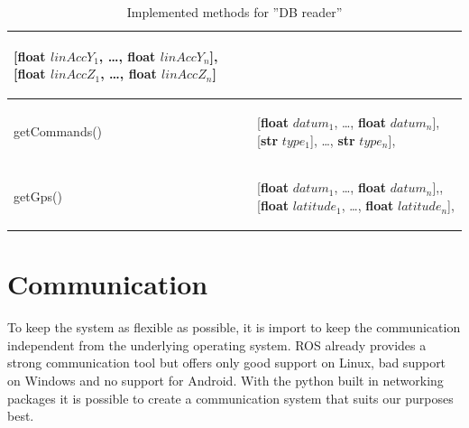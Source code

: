 \documentclass[]{scrreprt}
\begin{document}
\begin{table}[H]
\begin{tabular}{|l|l|}
\begin{pbox}{6.7cm}
{					[\textbf{float} $linAccY_1$, \dots, \textbf{float} $linAccY_n$],
					[\textbf{float} $linAccZ_1$, \dots, \textbf{float} $linAccZ_n$]
					\vspace{.3\baselineskip}}\end{pbox}\\ 
			\hline 
			\begin{pbox}{6.0cm}{\vspace{.2\baselineskip}
					getCommands()
					\vspace{.3\baselineskip}} 
			\end{pbox}&
			\begin{pbox}{10.5cm}{\vspace{.2\baselineskip}
					[\textbf{float} $datum_1$, \dots, \textbf{float} $datum_n$],
					[\textbf{str} $type_1$], \dots, \textbf{str} $type_n$],\newline
					[\textbf{None} or \textbf{float list} $value_1$, \dots, \textbf{None} or \textbf{float list} $value_n$]
					\vspace{.3\baselineskip}}
			\end{pbox}\\ 
			\hline 
			\begin{pbox}{6.0cm}{\vspace{.2\baselineskip}
					getGps()
					\vspace{.3\baselineskip}} 
			\end{pbox}&
			\begin{pbox}{6.7cm}{\vspace{.2\baselineskip}
					[\textbf{float} $datum_1$, \dots, \textbf{float} $datum_n$],\newline
					[\textbf{float} $longitude_1$, \dots, \textbf{float} $longitude_n$],
					[\textbf{float} $latitude_1$, \dots, \textbf{float} $latitude_n$],
					\vspace{.3\baselineskip}}
			\end{pbox}\\ 
			\hline 
		\end{tabular}
	\caption{Implemented methods for ''DB reader''} \label{tab:dbReader} 
	\end{table}
	

\chapter{Communication}
	\label{sec:communication}
	To keep the system as flexible as possible, it is import to keep the communication independent from the underlying operating system. ROS already provides a strong communication tool but offers only good support on Linux, bad support on Windows and no support for Android. With the python built in networking packages it is possible to create a communication system that suits our purposes best.
\end{document}
